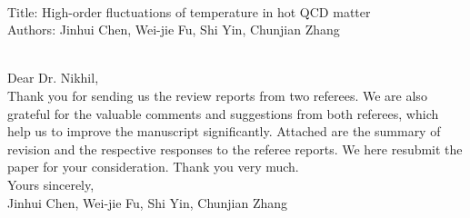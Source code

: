 \documentclass[aps,article,author-year,notitlepage,showpacs]{revtex4-2}
\begin{document}
\large

\\

\noindent Title: High-order fluctuations of temperature in hot QCD matter\\

\noindent Authors: Jinhui Chen, Wei-jie Fu, Shi Yin, Chunjian Zhang\\[3ex] 

\noindent Dear Dr. Nikhil,\\

\noindent Thank you for sending us the review reports from two referees. We are also grateful for the valuable comments and suggestions from both referees, which help us to improve the manuscript significantly. Attached are the summary of revision and the respective responses to the referee reports. We here resubmit the paper for your consideration. Thank you very much.\\

\noindent Yours sincerely,\\

\noindent Jinhui Chen, Wei-jie Fu, Shi Yin, Chunjian Zhang \\[3ex] 
\end{document}
